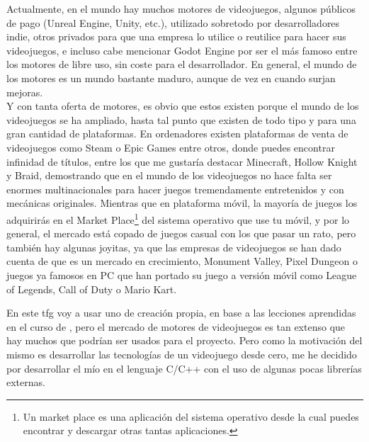 Actualmente, en el mundo hay muchos motores de videojuegos, algunos públicos de pago (Unreal Engine, Unity, etc.), utilizado sobretodo por desarrolladores indie, otros privados para que una empresa lo utilice o reutilice para hacer sus videojuegos, e incluso cabe mencionar Godot Engine por ser el más famoso entre los motores de libre uso, sin coste para el desarrollador. En general, el mundo de los motores es un mundo bastante maduro, aunque de vez en cuando surjan mejoras.
\\
Y con tanta oferta de motores, es obvio que estos existen porque el mundo de los videojuegos se ha ampliado, hasta tal punto que existen de todo tipo y para una gran cantidad de plataformas. En ordenadores existen plataformas de venta de videojuegos como Steam o Epic Games entre otros, donde puedes encontrar infinidad de títulos, entre los que me gustaría destacar Minecraft, Hollow Knight y Braid, demostrando que en el mundo de los videojuegos no hace falta ser enormes multinacionales para hacer juegos tremendamente entretenidos y con mecánicas originales. Mientras que en plataforma móvil, la mayoría de juegos los adquirirás en el Market Place\footnote{Un market place es una aplicación del sistema operativo desde la cual puedes encontrar y descargar otras tantas aplicaciones.} del sistema operativo que use tu móvil, y por lo general, el mercado está copado de juegos casual con los que pasar un rato, pero también hay algunas joyitas, ya que las empresas de videojuegos se han dado cuenta de que es un mercado en crecimiento, Monument Valley, Pixel Dungeon o juegos ya famosos en PC que han portado su juego a versión móvil como League of Legends, Call of Duty o Mario Kart.

En este \gls{tfg} voy a usar uno de creación propia, en base a las lecciones aprendidas en el curso de \citep{CursoMotorC++}, pero el mercado de motores de videojuegos es tan extenso que hay muchos que podrían ser usados para el proyecto. Pero como la motivación del mismo es desarrollar las tecnologías de un videojuego desde cero, me he decidido por desarrollar el mío en el lenguaje C/C++ con el uso de algunas pocas librerías externas.

